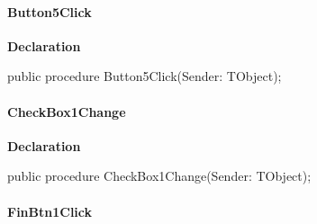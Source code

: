 \documentclass{report}
\newif\ifpdf
\begin{document}
\paragraph*{Button5Click}\hspace*{\fill}

\label{imainunit.TIWizFrm-Button5Click}
\begin{list}{}{
\setlength{\itemindent}{0cm}
\setlength{\listparindent}{0cm}
\setlength{\leftmargin}{\evensidemargin}
\addtolength{\leftmargin}{\tmplength}
\settowidth{\labelsep}{X}
\addtolength{\leftmargin}{\labelsep}
\setlength{\labelwidth}{\tmplength}
}
\item[\textbf{Declaration}\hfill]
\ifpdf
\begin{flushleft}
\fi
\begin{ttfamily}
public procedure Button5Click(Sender: TObject);\end{ttfamily}

\ifpdf
\end{flushleft}
\fi

\end{list}
\paragraph*{CheckBox1Change}\hspace*{\fill}

\label{imainunit.TIWizFrm-CheckBox1Change}
\begin{list}{}{
\setlength{\itemindent}{0cm}
\setlength{\listparindent}{0cm}
\setlength{\leftmargin}{\evensidemargin}
\addtolength{\leftmargin}{\tmplength}
\settowidth{\labelsep}{X}
\addtolength{\leftmargin}{\labelsep}
\setlength{\labelwidth}{\tmplength}
}
\item[\textbf{Declaration}\hfill]
\ifpdf
\begin{flushleft}
\fi
\begin{ttfamily}
public procedure CheckBox1Change(Sender: TObject);\end{ttfamily}

\ifpdf
\end{flushleft}
\fi

\end{list}
\paragraph*{FinBtn1Click}\hspace*{\fill}
\end{document}
